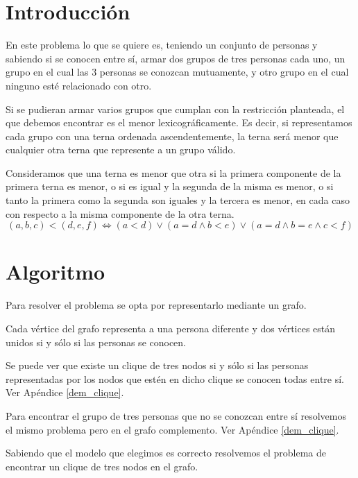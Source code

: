 \documentclass[a4paper, 12pt]{article}
\begin{document}
\section*{Introducci\'on}


En este problema lo que se quiere es, teniendo un conjunto de personas y sabiendo si se conocen entre s\'i, armar dos grupos de tres personas cada uno, un grupo en el cual las 3 personas se conozcan mutuamente, y otro grupo en el cual ninguno est\'e relacionado con otro.


Si se pudieran armar varios grupos que cumplan con la restricci\'on planteada, el que debemos encontrar es el menor lexicogr\'aficamente. Es decir, si representamos cada grupo con una terna ordenada ascendentemente, la terna ser\'a menor que cualquier otra terna que represente a un grupo v\'alido.

Consideramos que una terna es menor que otra si la primera componente de la primera terna es menor, o si es igual y la segunda de la misma es menor, o si tanto la primera como la segunda son iguales y la tercera es menor, en cada caso con respecto a la misma componente de la otra terna.
\begin{displaymath}
\left(a, b, c \right) < \left( d, e, f\right) \Leftrightarrow 
\left( a < d \right) \vee \left( a = d \wedge b < e \right) \vee \left( a = d \wedge b = e \wedge c < f \right)
\end{displaymath}


\section*{Algoritmo}


Para resolver el problema se opta por representarlo mediante un grafo.

Cada v\'ertice del grafo representa a una persona diferente y dos v\'ertices est\'an unidos si y s\'olo si las personas se conocen.


Se puede ver que existe un clique de tres nodos si y s\'olo si las personas representadas por los nodos que est\'en en dicho clique se conocen todas entre s\'i. Ver Ap\'endice \ref{dem_clique}.


Para encontrar el grupo de tres personas que no se conozcan entre s\'i resolvemos el mismo problema pero en el grafo complemento. Ver Ap\'endice \ref{dem_clique}.


Sabiendo que el modelo que elegimos es correcto resolvemos el problema de encontrar un clique de tres nodos en el grafo.
\end{document}
